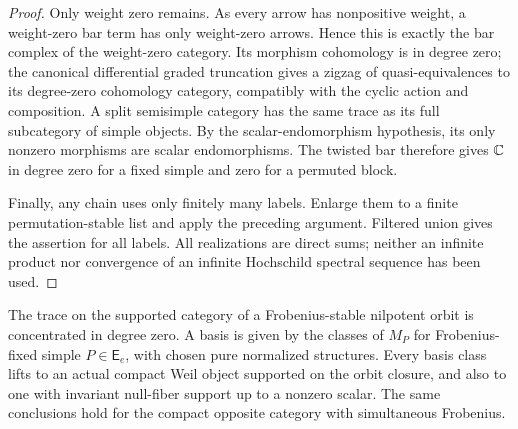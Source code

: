 \begin{proof}
Only weight zero remains.  As every arrow has nonpositive weight, a
weight-zero bar term has only weight-zero arrows.  Hence this is
exactly the bar complex of the weight-zero category.  Its morphism
cohomology is in degree zero; the canonical differential graded
truncation gives a zigzag of quasi-equivalences to its degree-zero
cohomology category, compatibly with the cyclic action and composition.
A split semisimple category has the same trace as its full subcategory
of simple objects.  By the scalar-endomorphism hypothesis, its only
nonzero morphisms are scalar endomorphisms.  The twisted bar therefore gives $\mathbb C$ in degree
zero for a fixed simple and zero for a permuted block.

Finally, any chain uses only finitely many labels.  Enlarge them to a
finite permutation-stable list and apply the preceding argument.
Filtered union gives the assertion for all labels.  All realizations
are direct sums; neither an infinite product nor convergence of an
infinite Hochschild spectral sequence has been used.
\end{proof}

\begin{proposition}\label{tr:orbit-trace}
The trace on the supported category of a Frobenius-stable nilpotent
orbit is concentrated in degree zero.  A basis is given by the classes
of $M_P$ for Frobenius-fixed simple $P\in\mathsf E_e$, with chosen
pure normalized structures.  Every basis class lifts to an actual
compact Weil object supported on the orbit closure, and also to one
with invariant null-fiber support up to a nonzero scalar.
The same conclusions hold for the compact opposite category with
simultaneous Frobenius.
\end{proposition}

